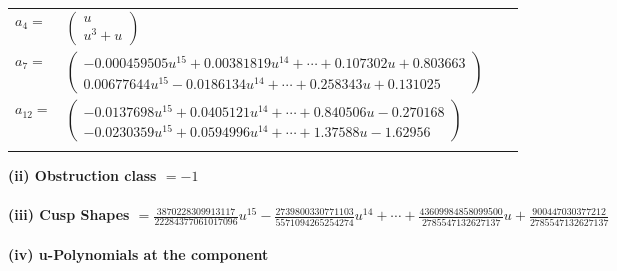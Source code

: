 \documentclass[1p]{elsarticle_modified}
\theoremstyle{definition}
\begin{document}
\begin{tabular}{m{7pt} m{180pt} m{7pt} m{180pt} }
\flushright $a_{4}=$&$\begin{pmatrix}u\\u^3+u\end{pmatrix}$ \\
\flushright $a_{7}=$&$\begin{pmatrix}-0.000459505 u^{15}+0.00381819 u^{14}+\cdots+0.107302 u+0.803663\\0.00677644 u^{15}-0.0186134 u^{14}+\cdots+0.258343 u+0.131025\end{pmatrix}$ \\
\flushright $a_{12}=$&$\begin{pmatrix}-0.0137698 u^{15}+0.0405121 u^{14}+\cdots+0.840506 u-0.270168\\-0.0230359 u^{15}+0.0594996 u^{14}+\cdots+1.37588 u-1.62956\end{pmatrix}$\\&\end{tabular}
\flushleft \textbf{(ii) Obstruction class $= -1$}\\~\\
\flushleft \textbf{(iii) Cusp Shapes $= \frac{3870228309913117}{22284377061017096} u^{15}-\frac{2739800330771103}{5571094265254274} u^{14}+\cdots+\frac{43609984858099500}{2785547132627137} u+\frac{900447030377212}{2785547132627137}$}\\~\\
\newpage\renewcommand{\arraystretch}{1}
\flushleft \textbf{(iv) u-Polynomials at the component}\newline \\
\end{document}
